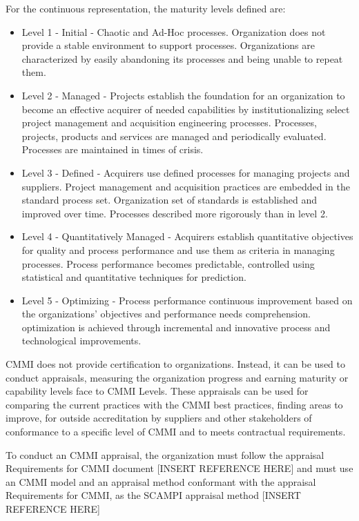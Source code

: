 For the continuous representation, the maturity levels defined are:

\begin{itemize}

\item Level 1 - Initial - Chaotic and Ad-Hoc processes. Organization does not provide a stable environment to support processes. Organizations are characterized by easily abandoning its processes and being unable to repeat them.

\item Level 2 - Managed - Projects establish the foundation for an organization to become an effective acquirer of needed capabilities by institutionalizing select project management and acquisition engineering processes. Processes, projects, products and services are managed and periodically evaluated. Processes are maintained in times of crisis.

\item Level 3 - Defined - Acquirers use defined processes for managing projects and suppliers. Project management and acquisition practices are embedded in the standard process set. Organization set of standards is established and improved over time. Processes described more rigorously than in level 2.

\item Level 4 - Quantitatively Managed - Acquirers establish quantitative objectives for quality and process performance and use them as criteria in managing processes. Process performance becomes predictable, controlled using statistical and quantitative techniques for prediction.

\item Level 5 - Optimizing - Process performance continuous improvement based on the organizations' objectives and performance needs comprehension. optimization is achieved through incremental and innovative process and technological improvements.

\end{itemize}

CMMI does not provide certification to organizations. Instead, it can be used to conduct appraisals, measuring the organization progress and earning maturity or capability levels face to CMMI Levels. These appraisals can be used for comparing the current practices with the CMMI best practices, finding areas to improve, for outside accreditation by suppliers and other stakeholders of conformance to a specific level of CMMI and to meets contractual requirements.\par
To conduct an CMMI appraisal, the organization must follow the appraisal Requirements for CMMI document [INSERT REFERENCE HERE] and must use an CMMI model and an appraisal method conformant with the appraisal Requirements for CMMI, as the SCAMPI appraisal method [INSERT REFERENCE HERE]\par


